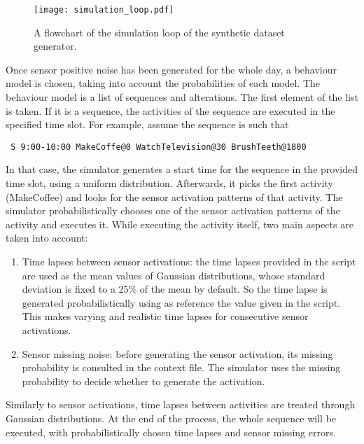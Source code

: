 \begin{figure}[htbp]
\centering
\texttt{[image: simulation\_loop.pdf]}
    \caption{A flowchart of the simulation loop of the synthetic dataset generator.}
    \label{fig-sim-loop}
\end{figure}

Once sensor positive noise has been generated for the whole day, a behaviour model is chosen, taking into account the probabilities of each model. The behaviour model is a list of sequences and alterations. The first element of the list is taken. If it is a sequence, the activities of the sequence are executed in the specified time slot. For example, assume the sequence is such that 

\begin{small}
\begin{lstlisting}
 S 9:00-10:00 MakeCoffe@0 WatchTelevision@30 BrushTeeth@1800 
\end{lstlisting}
\end{small}

\noindent In that case, the simulator generates a start time for the sequence in the provided time slot, using a uniform distribution. Afterwards, it picks the first activity (MakeCoffee) and looks for the sensor activation patterns of that activity. The simulator probabilistically chooses one of the sensor activation patterns of the activity and executes it. While executing the activity itself, two main aspects are taken into account:

\begin{enumerate}
 \item Time lapses between sensor activations: the time lapses provided in the script are used as the mean values of Gaussian distributions, whose standard deviation is fixed to a 25\% of the mean by default. So the time lapse is generated probabilistically using as reference the value given in the script. This makes varying and realistic time lapses for consecutive sensor activations.
 \item Sensor missing noise: before generating the sensor activation, its missing probability is consulted in the context file. The simulator uses the missing probability to decide whether to generate the activation.
\end{enumerate}

Similarly to sensor activations, time lapses between activities are treated through Gaussian distributions. At the end of the process, the whole sequence will be executed, with probabilistically chosen time lapses and sensor missing errors.


